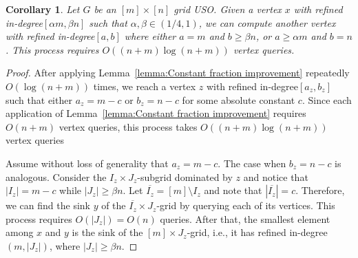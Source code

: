 \documentclass[a4paper,10pt]{article}
\newtheorem{corollary}{Corollary}
\newcommand{\indegree}{refined in-degree\xspace}
\begin{document}
\begin{corollary}
Let $G$ be an $[m]\times[n]$ grid USO. 
Given a vertex $x$ with \indegree $[\alpha m, \beta n]$ such that $\alpha, \beta \in (1/4,1)$, we can compute another vertex with \indegree $[a,b]$ where either $a = m$ and $b \geq \beta n$, or $a \geq \alpha m$ and $b  = n$. This process requires $O((n + m) \log (n+m))$ vertex queries.
\end{corollary}
\begin{proof}
After applying Lemma~\ref{lemma:Constant fraction improvement} repeatedly $O(\log(n + m))$ times, we reach a vertex $z$ with \indegree $[a_z, b_z]$ such that either $a_z = m - c$ or $b_z = n- c$ for some absolute constant $c$. 
Since each application of Lemma~\ref{lemma:Constant fraction improvement} requires $O(n+m)$ vertex queries, this process takes $O((n + m) \log (n+m))$ vertex queries

Assume without loss of generality that $a_z = m-c$. The case when $b_z = n-c$ is analogous. 
Consider the  $I_z\times J_z$-subgrid dominated by $z$ and 
notice that $|I_z| = m-c$ while $|J_z| \geq \beta n$. 
Let $\overline{I_z} = [m] \setminus I_z$ and note that $|\overline{I_z}| = c$. Therefore, we can find the sink $y$ of the $\overline{I_z}\times J_z$-grid by querying each of its vertices. This process requires $O(|J_z|) = O(n)$ queries.  After that, the smallest element among $x$ and $y$ is the sink of the $[m]\times J_z$-grid, i.e., it has \indegree $(m, |J_z|)$, where $|J_z|  \geq \beta n$.
\end{proof}







\end{document}
